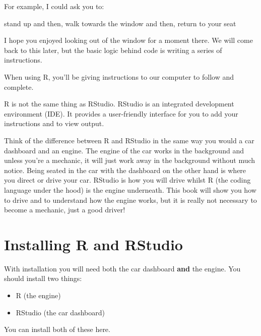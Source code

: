 \documentclass[
]{book}
\newenvironment{Shaded}{\begin{snugshade}}{\end{snugshade}}
\newcommand{\AttributeTok}[1]{\textcolor[rgb]{0.13,0.29,0.53}{#1}}
\newcommand{\NormalTok}[1]{#1}
\newcommand{\StringTok}[1]{\textcolor[rgb]{0.31,0.60,0.02}{#1}}
\providecommand{\tightlist}{%
  \setlength{\itemsep}{0pt}\setlength{\parskip}{0pt}}
\let\oldsection\section
\renewcommand{\section}{\needspace{5\baselineskip}\oldsection}
\begin{document}
For example, I could ask you to:

\begin{Shaded}
\begin{Highlighting}[]
\StringTok{\textasciigrave{}}\AttributeTok{stand up}\StringTok{\textasciigrave{}}\NormalTok{ and then,}
\StringTok{\textasciigrave{}}\AttributeTok{walk towards the window}\StringTok{\textasciigrave{}}\NormalTok{ and then,}
\StringTok{\textasciigrave{}}\AttributeTok{return to your seat}\StringTok{\textasciigrave{}}
\end{Highlighting}
\end{Shaded}

I hope you enjoyed looking out of the window for a moment there. We will come back to this later, but the basic logic behind code is writing a series of instructions.

When using R, you'll be giving instructions to our computer to follow and complete.

R is not the same thing as RStudio. RStudio is an integrated development environment (IDE). It provides a user-friendly interface for you to add your instructions and to view output.

Think of the difference between R and RStudio in the same way you would a car dashboard and an engine. The engine of the car works in the background and unless you're a mechanic, it will just work away in the background without much notice. Being seated in the car with the dashboard on the other hand is where you direct or drive your car. RStudio is how you will drive whilst R (the coding language under the hood) is the engine underneath. This book will show you how to drive and to understand how the engine works, but it is really not necessary to become a mechanic, just a good driver!

\section{Installing R and RStudio}\label{installing-r-and-rstudio}

With installation you will need both the car dashboard \textbf{and} the engine. You should install two things:

\begin{itemize}
\tightlist
\item
  R (the engine)
\item
  RStudio (the car dashboard)
\end{itemize}

You can install both of these here.
\end{document}
